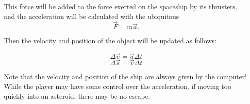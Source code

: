 \documentclass{article}
\begin{document}
This force will be added to the force exerted on the spaceship by its thrusters, and the acceleration will be calculated 
with the ubiquitous
$$\vec F = m \vec a\textrm{.}$$

Then the velocity and position of the object will be updated as follows:

$$\Delta \vec v = \vec a \Delta t$$
$$\Delta \vec s = \vec v \Delta t$$

Note that the velocity and position of the ship are always given by the computer! While the player may have some control
over the acceleration, if moving too quickly into an asteroid, there may be no escape.
\end{document}
